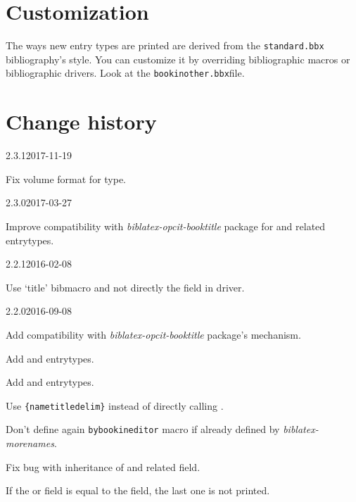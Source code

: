 \documentclass{ltxdockit}[2011/03/25]
\begin{document}
\section{Customization}

The ways new entry types are printed are derived from the \verb+standard.bbx+ bibliography's style. You can customize it by overriding bibliographic macros or bibliographic drivers. Look at the \verb+bookinother.bbx+file.

\section{Change history}


\begin{changelog}

\begin{release}{2.3.1}{2017-11-19}
  \item Fix volume format for  type.
\end{release}
\begin{release}{2.3.0}{2017-03-27}
  \item Improve compatibility with \emph{biblatex-opcit-booktitle} package for  and related entrytypes.
\end{release}

\begin{release}{2.2.1}{2016-02-08}
  \item Use `title' bibmacro and not directly the field in  driver.
\end{release}

\begin{release}{2.2.0}{2016-09-08}
  \item Add compatibility with \emph{biblatex-opcit-booktitle} package's mechanism.
  \item Add  and  entrytypes.
  \item Add  and  entrytypes.
  \item Use \verb+{nametitledelim}+ instead of directly  calling .
  \item Don't define again \verb+bybookineditor+ macro if already defined by \emph{biblatex-morenames}.
  \item Fix bug with inheritance of  and related field.
  \item If the  or  field is equal to the field, the last one is not printed.
\end{release}


\end{changelog}
\end{document}
